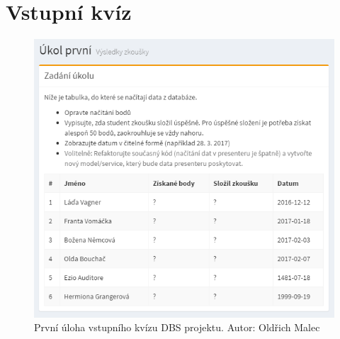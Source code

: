 \chapter{Vstupní kvíz} \label{ap:quiz}

\begin{figure}[H]
\includegraphics[width=\textwidth]{../png/quiz-1.png}
\caption{První úloha vstupního kvízu DBS projektu. Autor: Oldřich Malec} \label{picture:quiz-1}
\end{figure}

